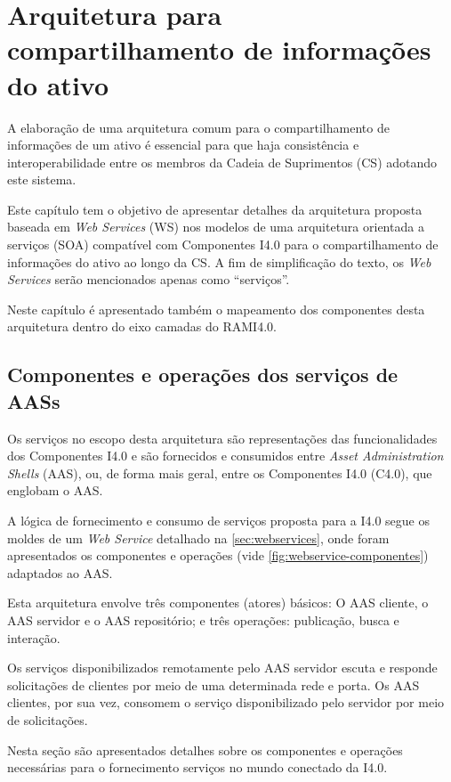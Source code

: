 \chapter{Arquitetura para compartilhamento de informações do ativo}
\label{cha:arquitetura}

A elaboração de uma arquitetura comum para o compartilhamento de informações de um ativo é essencial para que haja consistência e interoperabilidade entre os membros da Cadeia de Suprimentos (CS) adotando este sistema.

Este capítulo tem o objetivo de apresentar detalhes da arquitetura proposta baseada em \textit{Web Services} (WS) nos modelos de uma arquitetura orientada a serviços (SOA) compatível com Componentes I4.0 para o compartilhamento de informações do ativo ao longo da CS. A fim de simplificação do texto, os \textit{Web Services} serão mencionados apenas como ``serviços''.

Neste capítulo é apresentado também o mapeamento dos componentes desta arquitetura dentro do eixo camadas do RAMI4.0.

\section{Componentes e operações dos serviços de AASs}

Os serviços no escopo desta arquitetura são representações das funcionalidades dos Componentes I4.0 e são fornecidos e consumidos entre \textit{Asset Administration Shells} (AAS), ou, de forma mais geral, entre os Componentes I4.0 (C4.0), que englobam o AAS.

A lógica de fornecimento e consumo de serviços proposta para a I4.0 segue os moldes de um \textit{Web Service} detalhado na \autoref{sec:webservices}, onde foram apresentados os componentes e operações (vide \autoref{fig:webservice-componentes}) adaptados ao AAS.

Esta arquitetura envolve três componentes (atores) básicos: O AAS cliente, o AAS servidor e o AAS repositório; e três operações: publicação, busca e interação.

Os serviços disponibilizados remotamente pelo AAS servidor escuta e responde solicitações de clientes por meio de uma determinada rede e porta. Os AAS clientes, por sua vez, consomem o serviço disponibilizado pelo servidor por meio de solicitações.

Nesta seção são apresentados detalhes sobre os componentes e operações necessárias para o fornecimento serviços no mundo conectado da I4.0.

